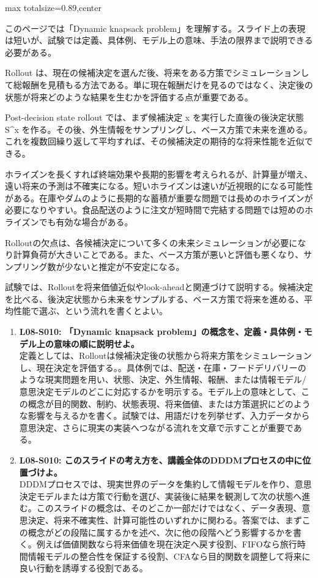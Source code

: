 \begin{minipage}[t]{0.58\textwidth}
\begin{adjustbox}{max totalsize={\textwidth}{0.89\textheight},center}
\begin{minipage}{\textwidth}\scriptsize
{}このページでは「Dynamic knapsack problem」を理解する。スライド上の表現は短いが、試験では定義、具体例、モデル上の意味、手法の限界まで説明できる必要がある。\par
Rollout は、現在の候補決定を選んだ後、将来をある方策でシミュレーションして総報酬を見積もる方法である。単に現在報酬だけを見るのではなく、決定後の状態が将来どのような結果を生むかを評価する点が重要である。\par
Post-decision state rollout では、まず候補決定 x を実行した直後の後決定状態 S\textasciicircum{}x を作る。その後、外生情報をサンプリングし、ベース方策で未来を進める。これを複数回繰り返して平均すれば、その候補決定の期待的な将来性能を近似できる。\par
ホライズンを長くすれば終端効果や長期的影響を考えられるが、計算量が増え、遠い将来の予測は不確実になる。短いホライズンは速いが近視眼的になる可能性がある。在庫やダムのように長期的な蓄積が重要な問題では長めのホライズンが必要になりやすい。食品配送のように注文が短時間で完結する問題では短めのホライズンでも有効な場合がある。\par
Rolloutの欠点は、各候補決定について多くの未来シミュレーションが必要になり計算負荷が大きいことである。また、ベース方策が悪いと評価も悪くなり、サンプリング数が少ないと推定が不安定になる。\par
試験では、Rolloutを将来価値近似やlook-aheadと関連づけて説明する。候補決定を比べる、後決定状態から未来をサンプルする、ベース方策で将来を進める、平均性能で選ぶ、という流れを書くとよい。\par{}\begin{enumerate}\item \textbf{L08-S010: 「Dynamic knapsack problem」の概念を、定義・具体例・モデル上の意味の順に説明せよ。}\\定義としては、Rolloutは候補決定後の状態から将来方策をシミュレーションし、現在決定を評価する。。具体例では、配送・在庫・フードデリバリーのような現実問題を用い、状態、決定、外生情報、報酬、または情報モデル/意思決定モデルのどこに対応するかを明示する。モデル上の意味として、この概念が目的関数、制約、状態表現、将来価値、または方策選択にどのような影響を与えるかを書く。試験では、用語だけを列挙せず、入力データから意思決定、さらに現実の実装へつながる流れを文章で示すことが重要である。\item \textbf{L08-S010: このスライドの考え方を、講義全体のDDDMプロセスの中に位置づけよ。}\\DDDMプロセスでは、現実世界のデータを集約して情報モデルを作り、意思決定モデルまたは方策で行動を選び、実装後に結果を観測して次の状態へ進む。このスライドの概念は、そのどこか一部だけではなく、データ表現、意思決定、将来不確実性、計算可能性のいずれかに関わる。答案では、まずこの概念がどの段階に属するかを述べ、次に他の段階へどう影響するかを書く。例えば価値関数なら将来価値を現在決定へ戻す役割、FIFOなら旅行時間情報モデルの整合性を保証する役割、CFAなら目的関数を調整して将来に良い行動を誘導する役割である。\end{enumerate}

\end{minipage}
\end{adjustbox}
\end{minipage}

